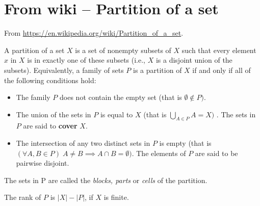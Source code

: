 \section{From wiki -- Partition of a set}

From \url{https://en.wikipedia.org/wiki/Partition_of_a_set}.

\begin{definition} 
	A partition of a set $X$ is a set of nonempty subsets of $X$ such that every element $x$ in $X$ is in exactly one of these subsets (i.e., $X$ is a disjoint union of the subsets).
	Equivalently, a family of sets $P$ is a partition of $X$ if and only if all of the following conditions hold:
	\begin{itemize}
		\item The family $P$ does not contain the empty set (that is $\emptyset \notin P)$.
		\item The union of the sets in $P$ is equal to $X$ (that is $\bigcup _{A\in P}A = X)$ . The sets in $P$ are said to \textbf{cover} $X$.
		\item The intersection of any two distinct sets in $P$ is empty (that is $(\forall A,B\in P)\;A\neq B\implies A\cap B=\emptyset)$. The elements of $P$ are said to be pairwise disjoint.
	\end{itemize}
	
	The sets in P are called the \textit{blocks, parts} or \textit{cells} of the partition.
	
	The rank of $P$ is $|X| − |P|$, if $X$ is finite.
\end{definition}

